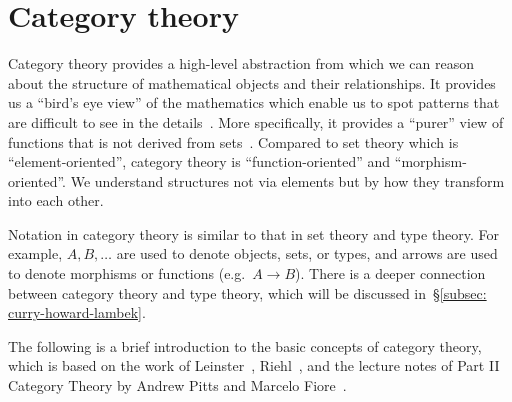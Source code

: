 \documentclass[12pt,a4paper]{report}
\theoremstyle{definition}
\newcommand{\secref}[1]{\S\ref{#1}}
\begin{document}
    \section{Category theory} \label{sec: cat}
        Category theory provides a high-level abstraction from which we can reason about the structure of mathematical objects and their relationships. It provides us a ``bird's eye view'' of the mathematics which enable us to spot patterns that are difficult to see in the details~\autocite{basic_cat}. More specifically, it provides a ``purer'' view of functions that is not derived from sets~\autocite{scott-lambda}. Compared to set theory which is ``element-oriented'', category theory is ``function-oriented'' and ``morphism-oriented''. We understand structures not via elements but by how they transform into each other. 

        Notation in category theory is similar to that in set theory and type theory. For example, $A, B, \dots$ are used to denote objects, sets, or types, and arrows are used to denote morphisms or functions (e.g.\ $A \to B$). There is a deeper connection between category theory and type theory, which will be discussed in~\secref{subsec: curry-howard-lambek}. 

        The following is a brief introduction to the basic concepts of category theory, which is based on the work of Leinster~\autocite{basic_cat}, 
        Riehl~\autocite{cat_context}, and the lecture notes of Part II Category Theory by Andrew Pitts and Marcelo Fiore~\autocite{cat_lecture_notes}.
\end{document}
